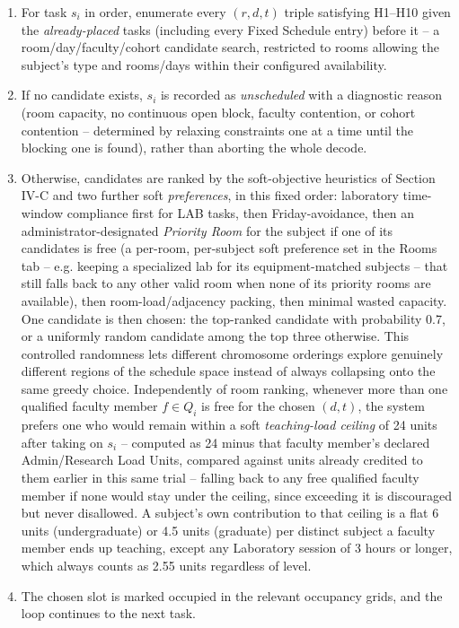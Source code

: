 \documentclass[conference]{IEEEtran}
\begin{document}
\begin{enumerate}
\item For task $s_i$ in order, enumerate every $(r, d, t)$ triple satisfying H1--H10 given the \emph{already-placed} tasks (including every Fixed Schedule entry) before it -- a room/day/faculty/cohort candidate search, restricted to rooms allowing the subject's type and rooms/days within their configured availability.
\item If no candidate exists, $s_i$ is recorded as \emph{unscheduled} with a diagnostic reason (room capacity, no continuous open block, faculty contention, or cohort contention -- determined by relaxing constraints one at a time until the blocking one is found), rather than aborting the whole decode.
\item Otherwise, candidates are ranked by the soft-objective heuristics of Section IV-C and two further soft \emph{preferences}, in this fixed order: laboratory time-window compliance first for LAB tasks, then Friday-avoidance, then an administrator-designated \emph{Priority Room} for the subject if one of its candidates is free (a per-room, per-subject soft preference set in the Rooms tab -- e.g. keeping a specialized lab for its equipment-matched subjects -- that still falls back to any other valid room when none of its priority rooms are available), then room-load/adjacency packing, then minimal wasted capacity. One candidate is then chosen: the top-ranked candidate with probability 0.7, or a uniformly random candidate among the top three otherwise. This controlled randomness lets different chromosome orderings explore genuinely different regions of the schedule space instead of always collapsing onto the same greedy choice. Independently of room ranking, whenever more than one qualified faculty member $f \in Q_i$ is free for the chosen $(d,t)$, the system prefers one who would remain within a soft \emph{teaching-load ceiling} of 24 units after taking on $s_i$ -- computed as 24 minus that faculty member's declared Admin/Research Load Units, compared against units already credited to them earlier in this same trial -- falling back to any free qualified faculty member if none would stay under the ceiling, since exceeding it is discouraged but never disallowed. A subject's own contribution to that ceiling is a flat 6 units (undergraduate) or 4.5 units (graduate) per distinct subject a faculty member ends up teaching, except any Laboratory session of 3 hours or longer, which always counts as 2.55 units regardless of level.
\item The chosen slot is marked occupied in the relevant occupancy grids, and the loop continues to the next task.
\end{enumerate}
\end{document}
